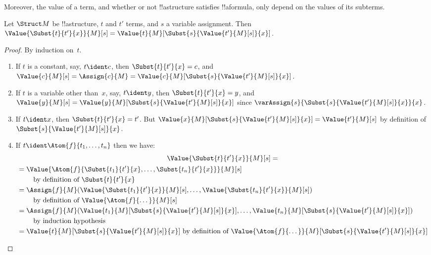 \documentclass[../../../include/open-logic-section]{subfiles}
\begin{document}
Moreover, the value of a term, and whether or not !!a{structure}
satisfies !!a{formula}, only depend on the values of its subterms.

\begin{prop}
Let $\Struct M$ be !!a{structure}, $t$ and $t'$ terms, and $s$ a
variable assignment. Then $\Value{\Subst{t}{t'}{x}}{M}[s] =
\Value{t}{M}[\Subst{s}{\Value{t'}{M}[s]}{x}]$.
\end{prop}

\begin{proof}
By induction on~$t$.
\begin{enumerate}
\item If $t$ is a constant, say, $t\ident c$, then $\Subst{t}{t'}{x} =
  c$, and $\Value{c}{M}[s] = \Assign{c}{M} =
  \Value{c}{M}[\Subst{s}{\Value{t'}{M}[s]}{x}]$.

\item If $t$ is a variable other than~$x$, say, $t \ident y$, then
  $\Subst{t}{t'}{x} = y$, and $\Value{y}{M}[s] =
  \Value{y}{M}[\Subst{s}{\Value{t'}{M}[s]}{x}]$ since
  $\varAssign{s}{\Subst{s}{\Value{t'}{M}[s]}{x}}{x}$.

\item If $t \ident x$, then $\Subst{t}{t'}{x} = t'$. But
  $\Value{x}{M}[\Subst{s}{\Value{t'}{M}[s]}{x}] = \Value{t'}{M}[s]$ by
  definition of~$\Subst{s}{\Value{t'}{M}[s]}{x}$.

\item If $t \ident \Atom{f}{t_1,\dots,t_n}$ then we have:
\begin{multline*}
  \Value{\Subst{t}{t'}{x}}{M}[s]  = \\
  \begin{aligned}[b]
& = \Value{\Atom{f}{\Subst{t_1}{t'}{x}, \dots, \Subst{t_n}{t'}{x}}}{M}[s]\\
& \qquad    \text{ by definition of $\Subst{t}{t'}{x}$}\\
& = \Assign{f}{M}(\Value{\Subst{t_1}{t'}{x}}{M}[s], \dots,
    \Value{\Subst{t_n}{t'}{x}}{M}[s])\\
    & \qquad  \text{ by definition of $\Value{\Atom{f}{\dots}}{M}[s]$}\\
& = \Assign{f}{M}(\Value{t_1}{M}[\Subst{s}{\Value{t'}{M}[s]}{x}], \dots,
   \Value{t_n}{M}[\Subst{s}{\Value{t'}{M}[s]}{x}])\\
& \qquad    \text{ by induction hypothesis}\\
& = \Value{t}{M}[\Subst{s}{\Value{t'}{M}[s]}{x}]
    \text{ by definition of $\Value{\Atom{f}{\dots}}{M}[\Subst{s}{\Value{t'}{M}[s]}{x}]$}
  \end{aligned}
\end{multline*}
\end{enumerate}
\end{proof}
\end{document}

